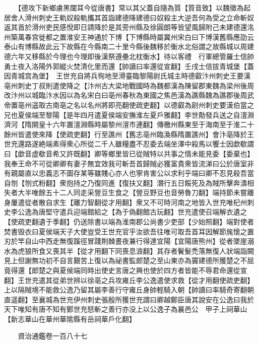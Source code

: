 　　【德攻下新鄉虜黑闥耳今從唐書】常以其父蓋自隨為質【質音致】以魏徵為起居舍人滑州刺史王軌奴殺軌攜其首詣建德降建德曰奴殺主大逆吾何為受之立命斬奴返其首於滑州吏民感悅即日請降於是其旁州縣及徐圓朗等皆望風歸附己未建德還洺州築萬春宫徙都之置淮安王神通於下博【下博縣時屬冀州宋白曰下博漢舊縣應劭云泰山有博縣故此云下故縣在今縣南二十里今縣後魏移於衡水北俗謂之故縣城以周建德六年又移縣於今理也今理即後漢祭遵壘北枕衡水】待以客禮　行軍總管羅士信帥勇士夜入洛陽外郭縱火焚清化里而還【帥讀曰率還從宣翻】壬戌士信拔青城堡【蓋因青城宫為堡】　王世充自將兵徇地至滑臺臨黎陽尉氏城主時德叡汴州刺史王要漢亳州刺史丁叔則遣使降之【汴州古大梁地戰國時為魏都漢為陳留郡東魏為梁州後周改汴州以城臨汴水因以為名宋白曰亳州春秋為東國之焦邑漢為譙縣魏為譙郡後周武帝置亳州遥取古南亳之名以名州將即亮翻使疏吏翻】以德叡為尉州刺史要漢伯當之兄也夏侯端至黎陽【是年四月遣夏侯端安撫淮左夏戶雅翻】李世勣發兵送之自澶淵濟河【隋開皇十六年置澶淵縣時屬黎州澶市連翻】傳檄州縣東至于海南至于淮二十餘州皆遣使來降【使疏吏翻】行至譙州【舊志亳州臨渙縣隋置譙州】會汴亳降於王世充還路遂絶端素得衆心所從二千人雖糧盡不忍委去端坐澤中殺馬以饗士因歔欷謂曰【歔音虚欷音希又許既翻】卿等鄉里皆已從賊特以共事之情未能見委【委棄也】我奉王命不可從卿卿有妻子無宜效我可斬吾首歸賊必獲富貴衆皆流涕曰公於唐室非有親屬直以忠義志不圖存某等雖賤心亦人也寧肯害公以求利乎端曰卿不忍見殺吾當自刎【刎式粉翻】衆抱持之乃復同進【復扶又翻】潛行五日餒死及為賊所擊奔潰相失者大半唯餘五十二人同走采䝁豆生食之【䝁豆野豆也音勞魯刀翻】端持節未嘗離身屢遣從者散自求生【離力智翻從才用翻】衆又不可時河南之地皆入世充唯杞州刺史李公逸為唐堅守遣兵迎端館給之【為于偽翻館古玩翻】世充遣使召端解衣遺之【使疏吏翻遺于季翻】仍送除書以端為淮南郡公尚書少吏部【少始照翻】端對使者焚書毁衣曰夏侯端天子大使豈受王世充官乎汝欲吾往唯可取吾首耳因解節旄懷之置刃於竿自山中西走無復蹊徑冒踐荆棘晝夜兼行得達宜陽【宜陽唐熊州】從者墜崖溺水為虎狼所食又喪其半【從才用翻下同喪息浪翻】其存者鬢髮禿落無復人狀端詣闕見上但謝無功初不自言艱苦上復以為祕書監郎楚之至山東亦為竇建德所獲楚之不屈竟得還【郎楚之與夏侯端同時出使史言唐之興也使於四方者皆能不辱君命還從宣翻】王世充遣其從弟世辨以徐亳之兵攻雍丘李公逸遣使求救【從才用翻使疏吏翻】上以隔賊境不能救公逸乃留其屬李善行守雍丘身帥輕騎入朝【帥讀曰率騎奇寄翻朝直遥翻】至襄城為世充伊州刺史張殷所獲世充謂曰卿越鄭臣唐其說安在公逸曰我於天下唯知有唐不知有鄭世充怒斬之善行亦没上以公逸子為襄邑公　甲子上祠華山【新志華山在華州華隂縣有岳祠華戶化翻】

　　資治通鑑卷一百八十七


    


 


